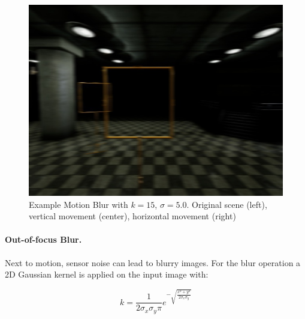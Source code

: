 \begin{figure}[htbp]
\begin{minipage}{0.33\textwidth}
		\includegraphics[width=\textwidth]{fig/gate_example_motionblur_h}
	\end{minipage}
	\caption{Example Motion Blur with $k=15$, $\sigma=5.0$. Original scene (left), vertical movement (center), horizontal movement (right)}
	\label{fig:motionblur}
\end{figure}


\paragraph{Out-of-focus Blur.}

Next to motion, sensor noise can lead to blurry images. For the blur operation a 2D Gaussian kernel is applied on the input image with:

\begin{equation}
 k = \frac{1}{2\sigma_x\sigma_y\pi}e^{-\sqrt{\frac{x^2 + y^2}{2\sigma_x\sigma_y}}} 
\end{equation}

